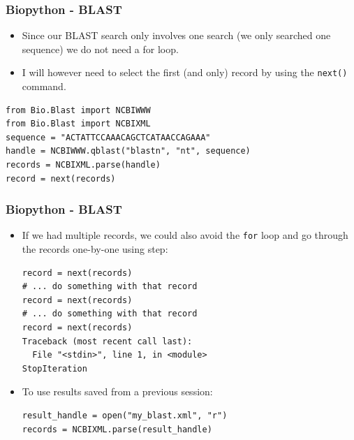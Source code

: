 \documentclass[xcolor=svgnames]{beamer}
\newcommand{\ft}[1]{\frametitle{#1}}
\begin{document}
\begin{frame}[fragile]\ft{Biopython - BLAST}
\begin{itemize}
\item Since our BLAST search only involves one search (we only searched one sequence)  we do not need a for loop. 
\item I will however need to select the first (and only) record by using the {\tt next()} command.
\end{itemize}
 \begin{Verbatim}[frame=single, xleftmargin=0.2in]
from Bio.Blast import NCBIWWW
from Bio.Blast import NCBIXML
sequence = "ACTATTCCAAACAGCTCATAACCAGAAA"
handle = NCBIWWW.qblast("blastn", "nt", sequence)
records = NCBIXML.parse(handle)
record = next(records)
 \end{Verbatim}
\end{frame}


\begin{frame}[fragile]\ft{Biopython - BLAST}
\begin{itemize}
\item If we had multiple records, we could also avoid the {\tt for} loop and go through the records one-by-one using step:

\begin{Verbatim}[xleftmargin=.2in, frame=single]
record = next(records)
# ... do something with that record
record = next(records)
# ... do something with that record
record = next(records)
Traceback (most recent call last):
  File "<stdin>", line 1, in <module>
StopIteration
\end{Verbatim}
\item  To use results saved from a previous session:
\begin{Verbatim}[frame=single]
result_handle = open("my_blast.xml", "r") 
records = NCBIXML.parse(result_handle)
\end{Verbatim}

\end{itemize}
\end{frame}
\end{document}
